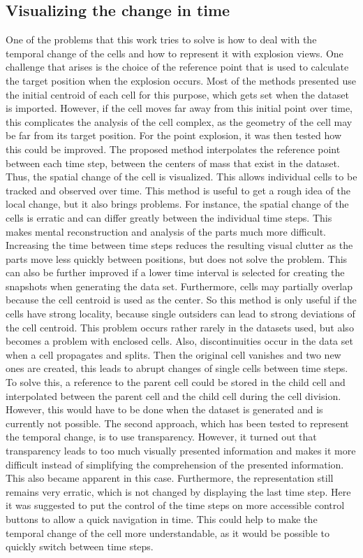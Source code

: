 \subsection{Visualizing the change in time}
One of the problems that this work tries to solve is how to deal with the temporal change of the cells and how to represent it with explosion views. One challenge that arises is the choice of the reference point that is used to calculate the target position when the explosion occurs. Most of the methods presented use the initial centroid of each cell for this purpose, which gets set when the dataset is imported. However, if the cell moves far away from this initial point over time, this complicates the analysis of the cell complex, as the geometry of the cell may be far from its target position.
For the point explosion, it was then tested how this could be improved. The proposed method interpolates the reference point between each time step, between the centers of mass that exist in the dataset. Thus, the spatial change of the cell is visualized. This allows individual cells to be tracked and observed over time. This method is useful to get a rough idea of the local change, but it also brings problems. For instance, the spatial change of the cells is erratic and can differ greatly between the individual time steps. This makes mental reconstruction and analysis of the parts much more difficult. Increasing the time between time steps reduces the resulting visual clutter as the parts move less quickly between positions, but does not solve the problem. This can also be further improved if a lower time interval is selected for creating the snapshots when generating the data set. Furthermore, cells may partially overlap because the cell centroid is used as the center. So this method is only useful if the cells have strong locality, because single outsiders can lead to strong deviations of the cell centroid. This problem occurs rather rarely in the datasets used, but also becomes a problem with enclosed cells. Also, discontinuities occur in the data set when a cell propagates and splits. Then the original cell vanishes and two new ones are created, this leads to abrupt changes of single cells between time steps. To solve this, a reference to the parent cell could be stored in the child cell and interpolated between the parent cell and the child cell during the cell division. However, this would have to be done when the dataset is generated and is currently not possible.
The second approach, which has been tested to represent the temporal change, is to use transparency. However, it turned out that transparency leads to too much visually presented information and makes it more difficult instead of simplifying the comprehension of the presented information. This also became apparent in this case. Furthermore, the representation still remains very erratic, which is not changed by displaying the last time step. Here it was suggested to put the control of the time steps on more accessible control buttons to allow a quick navigation in time. This could help to make the temporal change of the cell more understandable, as it would be possible to quickly switch between time steps.

